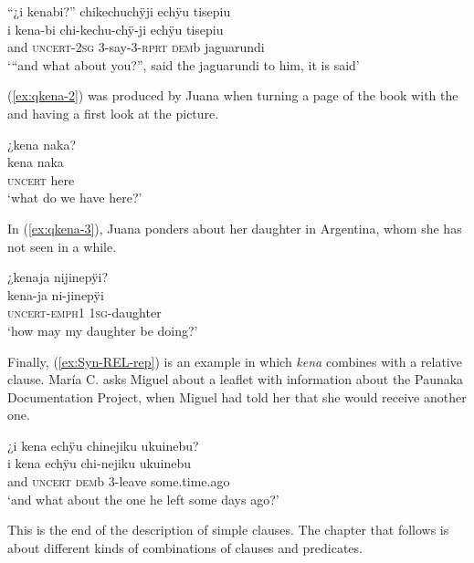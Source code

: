 \ea\label{ex:qkena-1}
\begingl
\glpreamble “¿i kenabi?” chikechuchÿji echÿu tisepiu\\
\gla i kena-bi chi-kechu-chÿ-ji echÿu tisepiu\\
\glb and \textsc{uncert}-2\textsc{sg} 3-say-3-\textsc{rprt} \textsc{dem}b jaguarundi\\
\glft ‘“and what about you?”, said the jaguarundi to him, it is said’
\endgl
\trailingcitation{[jmx-n120429ls-x5.360-361]}
\xe

(\ref{ex:qkena-2}) was produced by Juana when turning a page of the book with the  and having a first look at the picture.

\ea\label{ex:qkena-2}
\begingl
\glpreamble ¿kena naka?\\
\gla kena naka\\
\glb \textsc{uncert} here\\
\glft ‘what do we have here?’
\endgl
\trailingcitation{[jxx-a120516l-a.033]}
\xe

In (\ref{ex:qkena-3}), Juana ponders about her daughter in Argentina, whom she has not seen in a while.

\ea\label{ex:qkena-3}
\begingl
\glpreamble ¿kenaja nijinepÿi?\\
\gla kena-ja ni-jinepÿi\\
\glb \textsc{uncert}-\textsc{emph}1 1\textsc{sg}-daughter\\
\glft ‘how may my daughter be doing?’
\endgl
\trailingcitation{[jxx-e120516l-1.022]}
\xe

Finally, (\ref{ex:Syn-REL-rep}) is an example in which \textit{kena} combines with a relative clause. María C. asks Miguel about a leaflet with information about the Paunaka Documentation Project, when Miguel had told her that she would receive another one.

\ea\label{ex:Syn-REL-rep}
\begingl
\glpreamble ¿i kena echÿu chinejiku ukuinebu?\\
\gla i kena echÿu chi-nejiku ukuinebu\\
\glb and \textsc{uncert} \textsc{dem}b 3-leave some.time.ago\\
\glft ‘and what about the one he left some days ago?’
\endgl
\trailingcitation{[mux-c110810l.131]}
\xe
{}



This is the end of the description of simple clauses. The chapter that follows is about different kinds of combinations of clauses and predicates.
